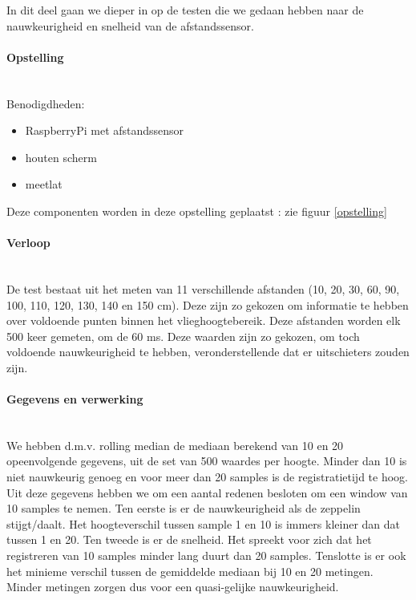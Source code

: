 \documentclass[eind]{penoverslag}
\begin{document}
In dit deel gaan we dieper in op de testen die we gedaan hebben naar de nauwkeurigheid en snelheid van de afstandssensor.

\paragraph{Opstelling} ~\\
Benodigdheden:
\begin{itemize}
\item RaspberryPi met afstandssensor
\item houten scherm
\item meetlat
\end{itemize}
Deze componenten worden in deze opstelling geplaatst : zie figuur \ref{opstelling}


\paragraph{Verloop} ~\\
De test bestaat uit het meten van 11 verschillende afstanden (10, 20, 30, 60, 90, 100, 110, 120, 130, 140 en 150 cm). Deze zijn zo gekozen om informatie te hebben over voldoende punten binnen het vlieghoogtebereik. Deze afstanden worden elk 500 keer gemeten, om de 60 ms. Deze waarden zijn zo gekozen, om toch voldoende nauwkeurigheid te hebben, veronderstellende dat er uitschieters zouden zijn.

\paragraph{Gegevens en verwerking} ~\\
We hebben d.m.v. rolling median de mediaan berekend van 10 en 20 opeenvolgende gegevens, uit de set van 500 waardes per hoogte. Minder dan 10 is niet nauwkeurig genoeg en voor meer dan 20 samples is de registratietijd te hoog. Uit deze gegevens hebben we om een aantal redenen besloten om een window van 10 samples te nemen. Ten eerste is er de nauwkeurigheid als de zeppelin stijgt/daalt. Het hoogteverschil tussen sample 1 en 10 is immers kleiner dan dat tussen 1 en 20. Ten tweede is er de snelheid. Het spreekt voor zich dat het registreren van 10 samples minder lang duurt dan 20 samples. Tenslotte is er ook het minieme verschil tussen de gemiddelde mediaan bij 10 en 20 metingen. Minder metingen zorgen dus voor een quasi-gelijke nauwkeurigheid.
\end{document}
